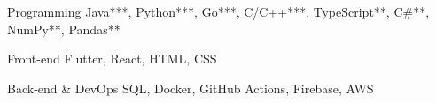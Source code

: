 

\begin{cvskills}

  \cvskill
    {Programming} %
    {Java***, Python***, Go***, C/C++***, TypeScript**, C\#**, NumPy**, Pandas**} %

  \cvskill
    {Front-end} %
    {Flutter, React, HTML, CSS} %

  \cvskill
    {Back-end \& DevOps} %
    {SQL, Docker, GitHub Actions, Firebase, AWS} %



    
\end{cvskills}
